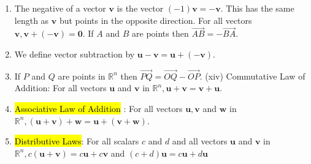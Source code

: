 \documentclass[10pt]{article}
\begin{document}
\begin{enumerate}
\item The negative of a vector $\mathbf{v}$ is the vector $(-1) \mathbf{v}=-\mathbf{v}$. This has the same length as $\mathbf{v}$ but points in the opposite direction. For all vectors $\mathbf{v}, \mathbf{v}+(-\mathbf{v})=\mathbf{0}$. If $A$ and $B$ are points then $\overrightarrow{A B}=-\overrightarrow{B A}$.

\item We define vector subtraction by $\mathbf{u}-\mathbf{v}=\mathbf{u}+(-\mathbf{v})$.

\item If $P$ and $Q$ are points in $\mathbb{R}^{n}$ then $\overrightarrow{P Q}=\overrightarrow{O Q}-\overrightarrow{O P}$. (xiv) Commutative Law of Addition: For all vectors $\mathbf{u}$ and $\mathbf{v}$ in $\mathbb{R}^{n}, \mathbf{u}+\mathbf{v}=\mathbf{v}+\mathbf{u}$.

\item \hl{Associative Law of Addition} : For all vectors $\mathbf{u}, \mathbf{v}$ and $\mathbf{w}$ in $\mathbb{R}^{n},(\mathbf{u}+\mathbf{v})+\mathbf{w}=\mathbf{u}+(\mathbf{v}+\mathbf{w})$.

\item \hl{Distributive Laws}: For all scalars $c$ and $d$ and all vectors $\mathbf{u}$ and $\mathbf{v}$ in $\mathbb{R}^{n}, c(\mathbf{u}+\mathbf{v})=c \mathbf{u}+c \mathbf{v}$ and $(c+d) \mathbf{u}=c \mathbf{u}+d \mathbf{u}$

\end{enumerate}
\end{document}
